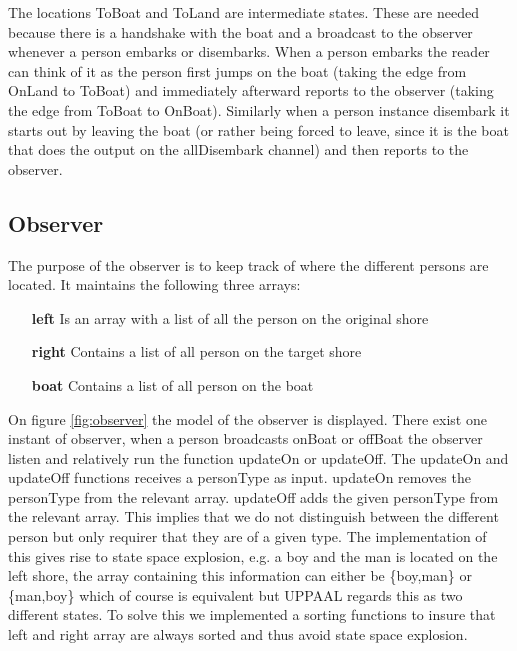 The locations ToBoat and ToLand are intermediate states.
These are needed because there is a handshake with the boat and a broadcast to the observer whenever a person embarks or disembarks.
When a person embarks the reader can think of it as the person first jumps on the boat (taking the edge from OnLand to ToBoat) and immediately afterward reports to the observer (taking the edge from ToBoat to OnBoat).
Similarly when a person instance disembark it starts out by leaving the boat (or rather being forced to leave, since it is the boat that does the output on the allDisembark channel) and then reports to the observer.
















\subsection{Observer}
The purpose of the observer is to keep track of where the different persons are located. It maintains the following three arrays:
\begin{itemize}
	\item[\textbf{left}] Is an array with a list of all the person on the original shore
	\item[\textbf{right}] Contains a list of all person on the target shore
	\item[\textbf{boat}] Contains a list of all person on the boat
\end{itemize}

On figure \ref{fig:observer} the model of the observer is displayed. There exist one instant of observer, when a person broadcasts onBoat or offBoat the observer listen and relatively run the function updateOn or updateOff. 
The updateOn and updateOff functions receives a personType as input. updateOn removes the personType from the relevant array.
updateOff adds the given personType from the relevant array.
This implies that we do not distinguish between the different person but only requirer that they are of a given type.
The implementation of this gives rise to state space explosion, e.g. a boy and the man is located on the left shore, the array containing this information can either be \{boy,man\} or \{man,boy\} which of course is equivalent but UPPAAL regards this as two different states.
To solve this we implemented a sorting functions to insure that left and right array are always sorted and thus avoid state space explosion.

